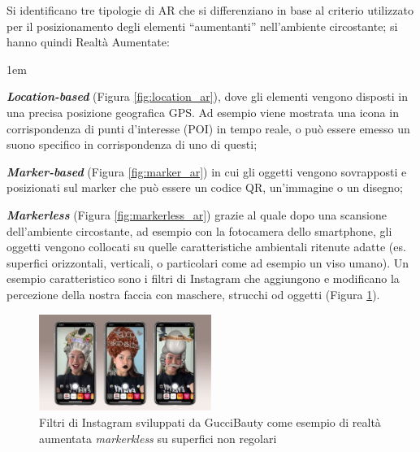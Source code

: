 Si identificano tre tipologie di AR che si differenziano in base al criterio utilizzato per il posizionamento degli elementi \enquote{aumentanti} nell'ambiente circostante; si hanno quindi Realtà Aumentate:

\begin{description}
    \itemsep1em
    \item \textbf{\textit{Location-based}} (Figura \ref{fig:location_ar}), dove gli elementi vengono disposti in una precisa posizione geografica GPS. Ad esempio viene mostrata una icona in corrispondenza di punti d'interesse (POI) in tempo reale, o può essere emesso un suono specifico in corrispondenza di uno di questi;
    \item \textbf{\textit{Marker-based}} (Figura \ref{fig:marker_ar}) in cui gli oggetti vengono sovrapposti e posizionati sul marker che può essere un codice QR, un'immagine o un disegno;
    \item \textbf{\textit{Markerless}} (Figura \ref{fig:markerless_ar}) grazie al quale dopo una scansione dell'ambiente circostante, ad esempio con la fotocamera dello smartphone, gli oggetti vengono collocati su quelle caratteristiche ambientali ritenute adatte (es. superfici orizzontali, verticali, o particolari come ad esempio un viso umano). Un esempio caratteristico sono i filtri di Instagram che aggiungono e modificano la percezione della nostra faccia con maschere, strucchi od oggetti (Figura \ref{fig:instaFilter}).
    \begin{figure} 
        \centering
        \includegraphics[width=0.5\textwidth]{img/instaFilter.jpeg}
        \caption{Filtri di Instagram sviluppati da GucciBauty \cite{gucciInstaAR} come esempio di realtà aumentata \textit{markerkless} su superfici non regolari }
        \label{fig:instaFilter}
    \end{figure}
\end{description}

